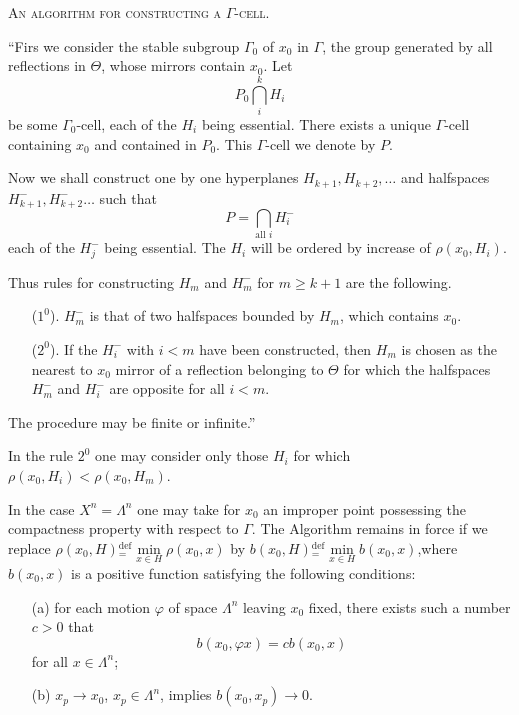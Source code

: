 \medskip
\noindent
\textsc{An algorithm for constructing a $\Gamma$-cell.}

``Firs we consider the stable subgroup $\Gamma_0$ of $x_0$ in $\Gamma$, \ie the group generated by all reflections in $\Theta$, whose mirrors contain $x_0$. Let 
$$
P_0 \bigcap\limits^k_{i} H_i
$$
be some $\Gamma_0$-cell, each of the $H_i$ being essential. There exists a unique $\Gamma$-cell containing $x_0$ and contained in $P_0$. This $\Gamma$-cell we denote by $P$.

Now we shall construct one by one hyperplanes $H_{k+1}, H_{k+2}, \ldots$ and halfspaces $H^-_{k+1}, H^-_{k+2} \ldots$ such that 
$$
P = \bigcap\limits_{\text{all } i} H^-_i
$$
each of the $H^-_j$ being essential. The $H_i$ will be ordered by increase of $\rho (x_0, H_i)$.

Thus rules for constructing $H_m$ and $H^-_m$ for $m\geqslant k +1$ are the following.
\begin{itemize}
\item[($1^0$).] $H^-_m$ is that of two halfspaces bounded by $H_m$, which contains $x_0$.

\item[($2^0$).] If the $H^-_i$ with $i < m$ have been constructed, then $H_m$ is chosen as the nearest to $x_0$ mirror of a reflection belonging to $\Theta$ for which the halfspaces $H^-_m$ and $H^-_i$ are opposite for all $i < m$.
\end{itemize}

The procedure may be finite or infinite.''

In the rule $2^0$ one may consider only those $H_i$ for which $\rho(x_0, H_i) < \rho (x_0 , H_m)$.

In the case $X^n = \Lambda^n$ one may take for $x_0$ an improper point possessing the compactness property with respect to $\Gamma$. The Algorithm remains in force if we replace $\rho (x_0, H) {}^{\text{def}}_= \min\limits_{x \in H} \rho (x_0, x) $ by $b(x_0, H) {}^{\text{def}}_= \min\limits_{x \in H} b(x_0 ,x)$,\pageoriginale where $b(x_0, x)$ is a positive function satisfying the following conditions:
\begin{itemize}
\item[(a)] for each motion $\varphi$ of space $\Lambda^n$ leaving $x_0$ fixed, there exists such a number $c > 0$ that
$$
b (x_0 , \varphi x) = c b( x_0 , x)
$$
for all $x \in \Lambda^n$;

\item[(b)] $x_p \to x_0$, $x_p \in \Lambda^n$, implies $b(x_0 , x_p) \to 0$. 
\end{itemize}

